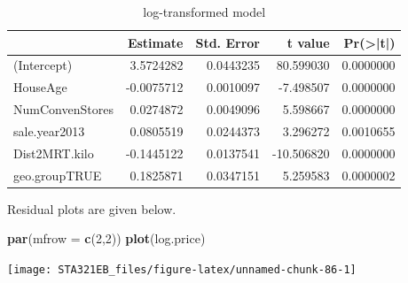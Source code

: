 \documentclass[
]{book}
\newenvironment{Shaded}{\begin{snugshade}}{\end{snugshade}}
\newcommand{\AttributeTok}[1]{\textcolor[rgb]{0.13,0.29,0.53}{#1}}
\newcommand{\DecValTok}[1]{\textcolor[rgb]{0.00,0.00,0.81}{#1}}
\newcommand{\FunctionTok}[1]{\textcolor[rgb]{0.13,0.29,0.53}{\textbf{#1}}}
\newcommand{\NormalTok}[1]{#1}
\newcommand{\OtherTok}[1]{\textcolor[rgb]{0.56,0.35,0.01}{#1}}
\newcommand{\SpecialCharTok}[1]{\textcolor[rgb]{0.81,0.36,0.00}{\textbf{#1}}}
\newcommand{\StringTok}[1]{\textcolor[rgb]{0.31,0.60,0.02}{#1}}
\begin{document}
\begin{Shaded}
\end{Shaded}

\begin{table}

\caption{\label{tab:unnamed-chunk-85}log-transformed model}
\centering
\begin{tabular}[t]{l|r|r|r|r}
\hline
  & Estimate & Std. Error & t value & Pr(>|t|)\\
\hline
(Intercept) & 3.5724282 & 0.0443235 & 80.599030 & 0.0000000\\
\hline
HouseAge & -0.0075712 & 0.0010097 & -7.498507 & 0.0000000\\
\hline
NumConvenStores & 0.0274872 & 0.0049096 & 5.598667 & 0.0000000\\
\hline
sale.year2013 & 0.0805519 & 0.0244373 & 3.296272 & 0.0010655\\
\hline
Dist2MRT.kilo & -0.1445122 & 0.0137541 & -10.506820 & 0.0000000\\
\hline
geo.groupTRUE & 0.1825871 & 0.0347151 & 5.259583 & 0.0000002\\
\hline
\end{tabular}
\end{table}

Residual plots are given below.

\begin{Shaded}
\begin{Highlighting}[]
\FunctionTok{par}\NormalTok{(}\AttributeTok{mfrow =} \FunctionTok{c}\NormalTok{(}\DecValTok{2}\NormalTok{,}\DecValTok{2}\NormalTok{))}
\FunctionTok{plot}\NormalTok{(log.price)}
\end{Highlighting}
\end{Shaded}

\begin{center}\texttt{[image: STA321EB\_files/figure-latex/unnamed-chunk-86-1]} \end{center}
\end{document}
